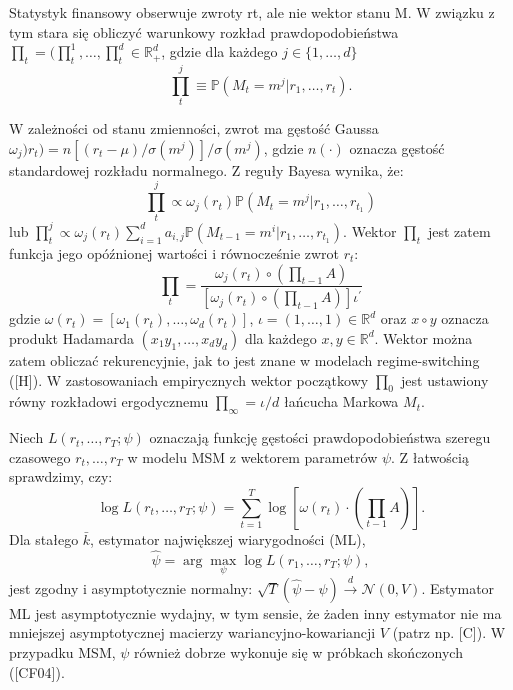 \documentclass[12pt]{article}
\theoremstyle{definition}
\begin{document}
Statystyk finansowy obserwuje zwroty rt, ale nie wektor stanu M. W związku z tym stara się obliczyć warunkowy rozkład prawdopodobieństwa $\prod_{t}=(\prod_{t}^{1},\ldots, \prod_{t}^{d} \in \mathbb{R}^{d}_{+}$, gdzie dla każdego $j \in \{1,\ldots, d\}$
$$\prod_{t}^{j} \equiv \mathbb{P}(M_t=m^j|r_1,\ldots,r_t).$$

W zależności od stanu zmienności, zwrot ma gęstość Gaussa $\omega_j)r_t)=n[(r_t-\mu)/\sigma(m^j)]/\sigma(m^j)$, gdzie $n(\cdot)$ oznacza gęstość standardowej rozkładu normalnego. Z reguły Bayesa wynika, że: 
\begin{equation}
\label{3.4}
\prod_{t}^{j} \propto \omega_j(r_t) \mathbb{P}(M_t=m^j|r_1,\ldots,r_{t_1})
\end{equation}
lub $\prod_{t}^{j} \propto \omega_j(r_t) \sum_{i=1}^{d} a_{i,j} \mathbb{P}(M_{t-1}=m^i|r_1,\ldots,r_{t_1})$. Wektor $\prod_{t}$ jest zatem funkcja jego opóźnionej wartości i równocześnie zwrot $r_t$:
\begin{equation}
\label{3.5}
\prod_{t} = \frac{\omega_j(r_t) \circ (\prod_{t-1}A)}{[\omega_j(r_t) \circ (\prod_{t-1}A)]\iota^{\prime}}
\end{equation}
gdzie $\omega(r_t) = [\omega_1 (r_t),\ldots,\omega_d (r_t)]$, $\iota = (1,\ldots ,1) \in \mathbb{R}^d$ oraz $x \circ y$ oznacza produkt Hadamarda $(x_1 y_1, \ldots, x_d y_d)$ dla każdego $x,y \in \mathbb{R}^d$. Wektor można zatem obliczać rekurencyjnie, jak to jest znane w modelach regime-switching ([H]). W zastosowaniach empirycznych wektor początkowy $\prod_{0}$ jest ustawiony równy rozkładowi ergodycznemu $\prod_{\infty}=\iota /d$ łańcucha Markowa $M_t$.

Niech $L(r_t, \ldots, r_T; \psi)$ oznaczają funkcję gęstości prawdopodobieństwa szeregu czasowego $r_t, \ldots, r_T$ w modelu MSM z wektorem parametrów $\psi$. Z łatwością sprawdzimy, czy:
\begin{equation}
\label{3.6}
\log L(r_t, \ldots, r_T; \psi) = \sum_{t=1}^{T}\log[\omega(r_t)\cdot (\prod_{t-1}A)].
\end{equation}
Dla stałego $\bar{k}$, estymator największej wiarygodności (ML),
$$\hat{\psi} = \arg\max_{\psi}\log L(r_1, \ldots, r_T; \psi),$$
jest zgodny i asymptotycznie normalny: $\sqrt{T}(\hat{\psi}-\psi) \stackrel{d}{\to} \mathcal{N}(0,V)$. Estymator ML jest asymptotycznie wydajny, w tym sensie, że żaden inny estymator nie ma mniejszej asymptotycznej macierzy wariancyjno-kowariancji $V$ (patrz np. [C]). W przypadku MSM, $\psi$ również dobrze wykonuje się w próbkach skończonych ([CF04]).
\end{document}
